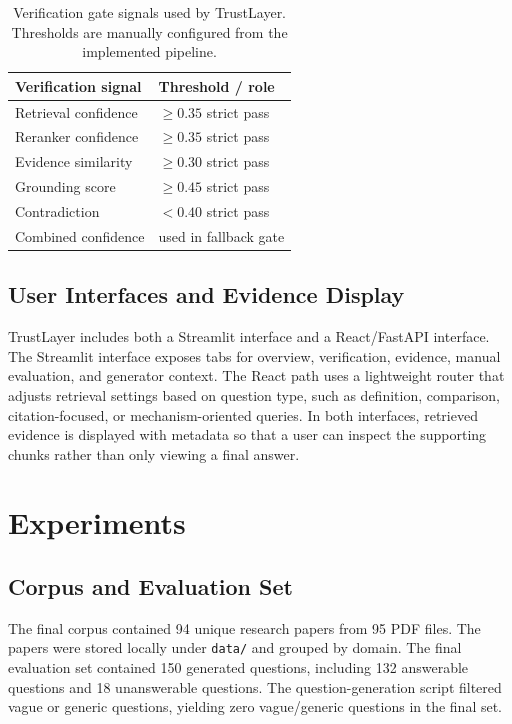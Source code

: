 \documentclass[11pt]{article}
\newcommand{\tablefont}{\footnotesize}
\begin{document}
\begin{table}[t]
\centering
\tablefont
\setlength{\tabcolsep}{3pt}
\begin{tabular}{p{}p{}}
\hline
\textbf{Verification signal} & \textbf{Threshold / role} \\
\hline
Retrieval confidence & $\geq 0.35$ strict pass \\
Reranker confidence & $\geq 0.35$ strict pass \\
Evidence similarity & $\geq 0.30$ strict pass \\
Grounding score & $\geq 0.45$ strict pass \\
Contradiction & $< 0.40$ strict pass \\
Combined confidence & used in fallback gate \\
\hline
\end{tabular}
\caption{Verification gate signals used by TrustLayer. Thresholds are manually configured from the implemented pipeline.}
\label{tab:thresholds}
\end{table}

\subsection{User Interfaces and Evidence Display}

TrustLayer includes both a Streamlit interface and a React/FastAPI interface. The Streamlit interface exposes tabs for overview, verification, evidence, manual evaluation, and generator context. The React path uses a lightweight router that adjusts retrieval settings based on question type, such as definition, comparison, citation-focused, or mechanism-oriented queries. In both interfaces, retrieved evidence is displayed with metadata so that a user can inspect the supporting chunks rather than only viewing a final answer.

\section{Experiments}

\subsection{Corpus and Evaluation Set}

The final corpus contained 94 unique research papers from 95 PDF files. The papers were stored locally under \texttt{data/} and grouped by domain. The final evaluation set contained 150 generated questions, including 132 answerable questions and 18 unanswerable questions. The question-generation script filtered vague or generic questions, yielding zero vague/generic questions in the final set.
\end{document}
